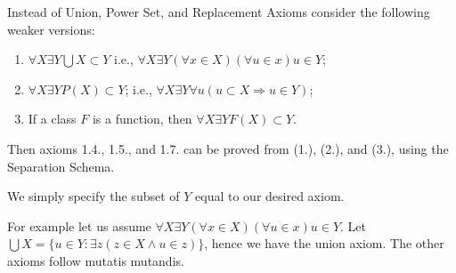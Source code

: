 \begin{problem}
  Instead of Union, Power Set, and Replacement Axioms consider the following weaker versions:
  \begin{enumerate}
    \item $\forall X \exists Y \bigcup X \subset Y$     i.e., $\forall X \exists Y (\forall x \in X) (\forall u \in x) u \in Y$;
    \item $\forall X \exists Y P(X) \subset Y$;     i.e., $\forall X \exists Y \forall u (u \subset X \Rightarrow u \in Y)$;
    \item If a class $F$ is a function, then $\forall X \exists Y F(X) \subset Y$.
  \end{enumerate}
  Then axioms 1.4., 1.5., and 1.7. can be proved from (1.), (2.), and (3.), using the Separation Schema.
\end{problem}

\begin{solution}
  We simply specify the subset of $Y$ equal to our desired axiom.

  For example let us assume $\forall X \exists Y (\forall x \in X) (\forall u \in x) u \in Y$.
  Let $\bigcup X = \{u \in Y : \exists z (z \in X \wedge u \in z)\}$, hence we have the union axiom.
  The other axioms follow mutatis mutandis.
\end{solution}
